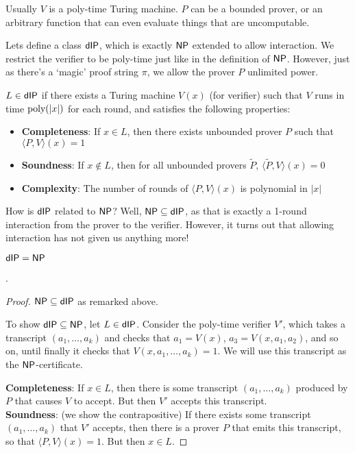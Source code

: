 \documentclass{article}
\begin{document}
Usually $V$ is a poly-time Turing machine. $P$ can be a bounded prover, or an arbitrary function that can even evaluate things that are uncomputable.

Lets define a class $\mathsf{dIP}$, which is exactly $\mathsf{NP}$ extended to allow interaction.
We restrict the verifier to be poly-time just like in the definition of $\mathsf{NP}$.
However, just as there's a `magic' proof string $\pi$, we allow the prover $P$ unlimited power.

\begin{definition}
    $L \in \mathsf{dIP}$ if there exists a Turing machine $V(x)$ (for verifier) such that
    $V$ runs in time $\operatorname*{\textup{poly}}(|x|)$ for each round, and satisfies the following properties:
    \begin{itemize}
        \item \textbf{Completeness}: If $x \in L$, then there exists unbounded prover $P$ such that $\langle P, V \rangle(x) = 1$
        \item \textbf{Soundness}: If $x \notin L$, then for all unbounded provers $\tilde{P}$, $\langle \tilde{P}, V \rangle(x) = 0$
        \item \textbf{Complexity}: The number of rounds of $\langle P, V \rangle(x)$ is polynomial in $|x|$
    \end{itemize}
\end{definition}

How is $\mathsf{dIP}$ related to $\mathsf{NP}$? Well, $\mathsf{NP} \subseteq \mathsf{dIP}$, as that is exactly a 1-round interaction from the prover to the verifier.
However, it turns out that allowing interaction has not given us anything more!

\begin{claim} $\mathsf{dIP} = \mathsf{NP}$\end{claim}.
\begin{proof}
    $\mathsf{NP} \subseteq \mathsf{dIP}$ as remarked above.

    To show $\mathsf{dIP} \subseteq \mathsf{NP}$, let $L \in \mathsf{dIP}$.
    Consider the poly-time verifier $V'$, which takes a transcript $(a_1, \ldots, a_k)$ and checks that
    $a_1 = V(x)$, $a_3 = V(x, a_1, a_2)$, and so on, until finally it checks that $V(x, a_1, \ldots, a_k) = 1$. 
    We will use this transcript as the $\mathsf{NP}$-certificate.

    \textbf{Completeness}: If $x \in L$, then there is some transcript $(a_1, \ldots, a_k)$ produced by $P$ that causes $V$ to accept.
    But then $V'$ accepts this transcript. \\
    \textbf{Soundness}: (we show the contrapositive) If there exists some transcript $(a_1, \ldots, a_k)$ that $V'$ accepts, then there is a prover $P$ that emits this transcript, so that $\langle P, V \rangle(x) = 1$. But then $x \in L$.
\end{proof}
\end{document}
